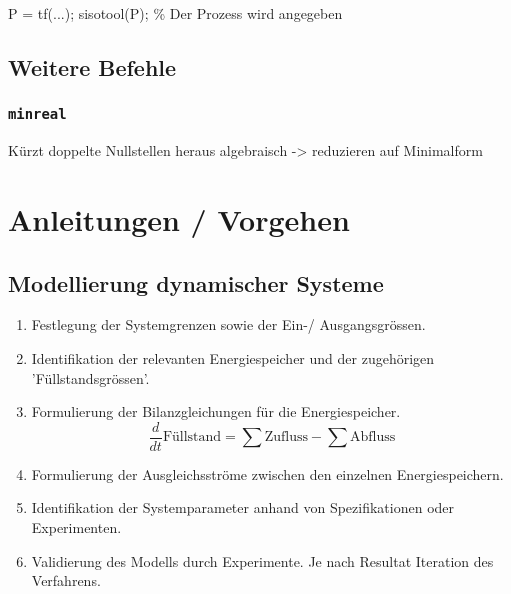 \documentclass[
  10pt,
  a4paper,
  twocolumn]{article}
\newenvironment{Shaded}{}{}
\newcommand{\CommentTok}[1]{\textcolor[rgb]{0.42,0.45,0.49}{#1}}
\newcommand{\NormalTok}[1]{\textcolor[rgb]{0.14,0.16,0.18}{#1}}
\newcommand{\OperatorTok}[1]{\textcolor[rgb]{0.14,0.16,0.18}{#1}}
\newcommand{\VariableTok}[1]{\textcolor[rgb]{0.89,0.38,0.04}{#1}}
\providecommand{\tightlist}{%
  \setlength{\itemsep}{0pt}\setlength{\parskip}{0pt}}\usepackage{longtable,booktabs,array}
\numberwithin{equation}{section}
\begin{document}
\begin{Shaded}
\begin{Highlighting}[]
\VariableTok{P} \OperatorTok{=} \VariableTok{tf}\NormalTok{(}\OperatorTok{...}\NormalTok{)}\OperatorTok{;}
\VariableTok{sisotool}\NormalTok{(}\VariableTok{P}\NormalTok{)}\OperatorTok{;} \CommentTok{\% Der Prozess wird angegeben}
\end{Highlighting}
\end{Shaded}

\subsection{Weitere Befehle}\label{weitere-befehle}

\subsubsection{\texorpdfstring{\texttt{minreal}}{minreal}}\label{minreal}

Kürzt doppelte Nullstellen heraus algebraisch -\textgreater{} reduzieren
auf Minimalform

\section{\texorpdfstring{\faFile*[regular] Anleitungen /
Vorgehen}{ Anleitungen / Vorgehen}}\label{anleitungen-vorgehen}

\subsection{Modellierung dynamischer
Systeme}\label{modellierung-dynamischer-systeme}

\begin{enumerate}
\def\labelenumi{\arabic{enumi}.}
\tightlist
\item
  Festlegung der Systemgrenzen sowie der Ein-/ Ausgangsgrössen.
\item
  Identifikation der relevanten Energiespeicher und der zugehörigen
  'Füllstandsgrössen'.
\item
  Formulierung der Bilanzgleichungen für die Energiespeicher. \[
  \frac{d}{dt}\text{Füllstand} = \sum{\text{Zufluss}}-\sum{\text{Abfluss}}
  \]
\item
  Formulierung der Ausgleichsströme zwischen den einzelnen
  Energiespeichern.
\item
  Identifikation der Systemparameter anhand von Spezifikationen oder
  Experimenten.
\item
  Validierung des Modells durch Experimente. Je nach Resultat Iteration
  des Verfahrens.
\end{enumerate}
\end{document}
